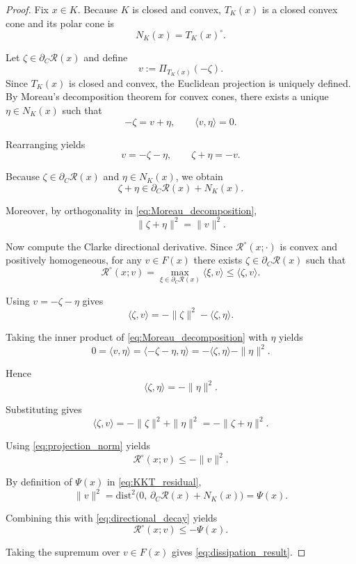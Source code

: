 \documentclass[10pt,a4paper]{amsart}
\begin{document}
\begin{proof}
Fix $x\in K$.
Because $K$ is closed and convex,
$T_K(x)$ is a closed convex cone and its polar cone is
\[
N_K(x)=T_K(x)^\circ .
\]

Let $\zeta\in\partial_C\mathcal R(x)$ and define
\[
v := \Pi_{T_K(x)}(-\zeta).
\]
Since $T_K(x)$ is closed and convex,
the Euclidean projection is uniquely defined. By Moreau's decomposition theorem for convex cones,
there exists a unique $\eta\in N_K(x)$ such that
\begin{equation}
-\zeta = v+\eta,
\qquad
\langle v,\eta\rangle = 0.
\label{eq:Moreau_decomposition}
\end{equation}

Rearranging yields
\[
v=-\zeta-\eta,
\qquad
\zeta+\eta=-v.
\]

Because $\zeta\in\partial_C\mathcal R(x)$ and $\eta\in N_K(x)$,
we obtain
\[
\zeta+\eta \in \partial_C\mathcal R(x)+N_K(x).
\]

Moreover, by orthogonality in
\eqref{eq:Moreau_decomposition},
\begin{equation}
\|\zeta+\eta\|^2=\|v\|^2 .
\label{eq:projection_norm}
\end{equation}

Now compute the Clarke directional derivative.
Since $\mathcal R^\circ(x;\cdot)$ is convex and positively homogeneous,
for any $v\in F(x)$ there exists $\zeta\in\partial_C\mathcal R(x)$
such that
\[
\mathcal R^\circ(x;v)
=
\max_{\xi\in\partial_C\mathcal R(x)}
\langle \xi,v\rangle
\le
\langle \zeta,v\rangle .
\]

Using $v=-\zeta-\eta$ gives
\[
\langle\zeta,v\rangle
=
-\|\zeta\|^2-\langle\zeta,\eta\rangle .
\]

Taking the inner product of
\eqref{eq:Moreau_decomposition}
with $\eta$ yields
\[
0
=
\langle v,\eta\rangle
=
\langle -\zeta-\eta,\eta\rangle
=
-\langle\zeta,\eta\rangle-\|\eta\|^2 .
\]

Hence
\[
\langle\zeta,\eta\rangle=-\|\eta\|^2 .
\]

Substituting gives
\[
\langle\zeta,v\rangle
=
-\|\zeta\|^2+\|\eta\|^2
=
-\|\zeta+\eta\|^2 .
\]

Using \eqref{eq:projection_norm} yields
\begin{equation}
\mathcal R^\circ(x;v)\le -\|v\|^2 .
\label{eq:directional_decay}
\end{equation}

By definition of $\Psi(x)$ in \eqref{eq:KKT_residual},
\[
\|v\|^2
=
\mathrm{dist}^2\!\big(
0,\,
\partial_C\mathcal R(x)+N_K(x)
\big)
=
\Psi(x).
\]

Combining this with \eqref{eq:directional_decay}
yields
\[
\mathcal R^\circ(x;v)
\le
-\Psi(x).
\]

Taking the supremum over $v\in F(x)$ gives
\eqref{eq:dissipation_result}.
\end{proof}
\end{document}
